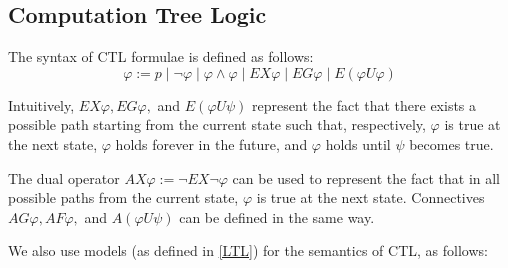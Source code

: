 \documentclass[11pt]{report}
\newenvironment{definition}[1][Definition]{\begin{trivlist}
\item[\hskip \labelsep {\bfseries #1}]}{\end{trivlist}}
\begin{document}
\subsection{Computation Tree Logic} 

\begin{definition} 
The syntax of CTL formulae is defined as follows: 
$$ \varphi := p \mid \lnot \varphi \mid \varphi \land \varphi \mid EX\varphi \mid EG\varphi \mid E(\varphi U \varphi)$$
\end{definition}

Intuitively, $ EX\varphi,  EG\varphi,$ and $ E(\varphi U \psi)$ represent the fact that there exists a possible path starting from the current state such that, respectively, $\varphi$ is true at the next state, $\varphi$ holds forever in the future, and $\varphi$ holds until $\psi$ becomes true.

The dual operator $AX\varphi := \lnot EX \lnot\varphi $ can be used to represent the fact that in all possible paths from the current state, $\varphi$ is true at the next state.
Connectives $AG\varphi, AF\varphi,$ and $A(\varphi U\psi)$ can be defined in the same way. 

We also use models (as defined in \ref{LTL}) for the semantics of CTL, as follows:
\end{document}
